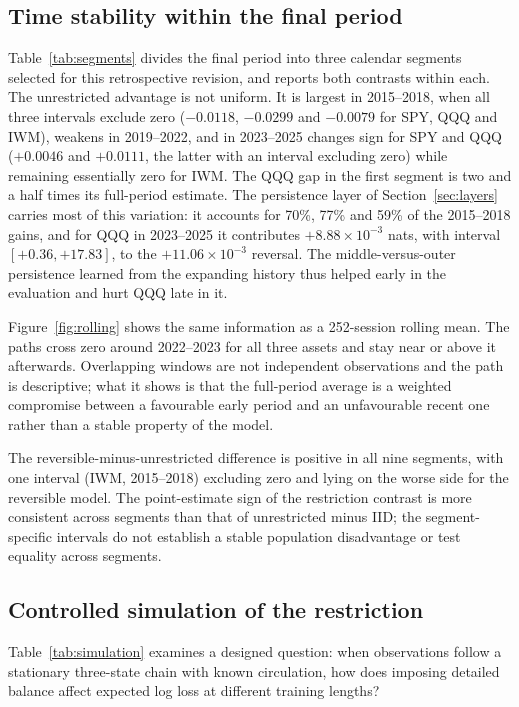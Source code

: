 \subsection{Time stability within the final period}\label{sec:stability}
Table~\ref{tab:segments} divides the final period into three calendar segments selected for this retrospective revision, and reports both contrasts within each. The unrestricted advantage is not uniform. It is largest in 2015--2018, when all three intervals exclude zero ($-0.0118$, $-0.0299$ and $-0.0079$ for SPY, QQQ and IWM), weakens in 2019--2022, and in 2023--2025 changes sign for SPY and QQQ ($+0.0046$ and $+0.0111$, the latter with an interval excluding zero) while remaining essentially zero for IWM. The QQQ gap in the first segment is two and a half times its full-period estimate. The persistence layer of Section~\ref{sec:layers} carries most of this variation: it accounts for 70\%, 77\% and 59\% of the 2015--2018 gains, and for QQQ in 2023--2025 it contributes $+8.88\times10^{-3}$ nats, with interval $[+0.36,+17.83]$, to the $+11.06\times10^{-3}$ reversal. The middle-versus-outer persistence learned from the expanding history thus helped early in the evaluation and hurt QQQ late in it.

Figure~\ref{fig:rolling} shows the same information as a 252-session rolling mean. The paths cross zero around 2022--2023 for all three assets and stay near or above it afterwards. Overlapping windows are not independent observations and the path is descriptive; what it shows is that the full-period average is a weighted compromise between a favourable early period and an unfavourable recent one rather than a stable property of the model.

The reversible-minus-unrestricted difference is positive in all nine segments, with one interval (IWM, 2015--2018) excluding zero and lying on the worse side for the reversible model. The point-estimate sign of the restriction contrast is more consistent across segments than that of unrestricted minus IID; the segment-specific intervals do not establish a stable population disadvantage or test equality across segments.

\subsection{Controlled simulation of the restriction}\label{sec:simulation}
Table~\ref{tab:simulation} examines a designed question: when observations follow a stationary three-state chain with known circulation, how does imposing detailed balance affect expected log loss at different training lengths?

